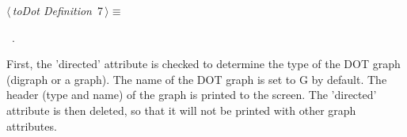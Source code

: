 \documentclass[a4paper]{report}
\begin{document}
\begin{flushleft} \small
\begin{minipage}{\linewidth}\label{scrap7}\raggedright\small
{} $\langle\,${\itshape toDot Definition}\nobreak\ {\footnotesize {7}}$\,\rangle\equiv$
\vspace{-1ex}
\begin{list}{}{} \item
\mbox{}\verb@@\\
\mbox{}\verb@private void toDot(){@\\
\mbox{}\verb@        @\hbox{$\langle\,${\itshape Print Header}\nobreak\ {\footnotesize {}}$\,\rangle$}\verb@@\\
\mbox{}\verb@        @\hbox{$\langle\,${\itshape Print Graph Attributes}\nobreak\ {\footnotesize {}}$\,\rangle$}\verb@@\\
\mbox{}\verb@        @\hbox{$\langle\,${\itshape Print Nodes}\nobreak\ {\footnotesize {}}$\,\rangle$}\verb@@\\
\mbox{}\verb@        @\hbox{$\langle\,${\itshape Print Edges}\nobreak\ {\footnotesize {}}$\,\rangle$}\verb@@\\
\mbox{}\verb@        System.out.println("}");@\\
\mbox{}\verb@}@\\
\mbox{}\verb@@{\NWsep}
\end{list}
\vspace{-1.5ex}
\footnotesize
\begin{list}{}{\setlength{\itemsep}{-\parsep}\setlength{\itemindent}{-\leftmargin}}
\item \NWtxtMacroRefIn\ .

\item{}
\end{list}
\end{minipage}\vspace{4ex}
\end{flushleft}
First, the 'directed' attribute is checked to determine the type of the DOT graph (digraph or a graph). The name of the DOT graph is set to G by default. The header (type and name) of the graph is printed to the screen. The 'directed' attribute is then deleted, so that it will not be printed with other graph attributes. 
\end{document}

